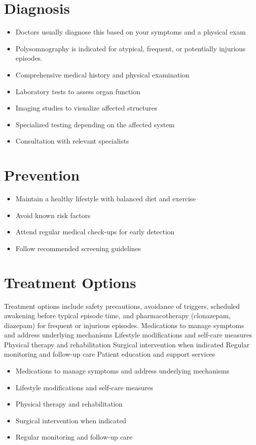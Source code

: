 \section{Diagnosis}
\begin{itemize}[noitemsep]
  \item Doctors usually diagnose this based on your symptoms and a physical exam
  \item Polysomnography is indicated for atypical, frequent, or potentially injurious episodes.
  \item Comprehensive medical history and physical examination
  \item Laboratory tests to assess organ function
  \item Imaging studies to visualize affected structures
  \item Specialized testing depending on the affected system
  \item Consultation with relevant specialists
\end{itemize}
\section{Prevention}
\begin{itemize}[noitemsep]
  \item Maintain a healthy lifestyle with balanced diet and exercise
  \item Avoid known risk factors
  \item Attend regular medical check-ups for early detection
  \item Follow recommended screening guidelines
\end{itemize}
\section{Treatment Options}
Treatment options include safety precautions, avoidance of triggers, scheduled awakening before typical episode time, and pharmacotherapy (clonazepam, diazepam) for frequent or injurious episodes. Medications to manage symptoms and address underlying mechanisms Lifestyle modifications and self-care measures Physical therapy and rehabilitation Surgical intervention when indicated Regular monitoring and follow-up care Patient education and support services

\begin{itemize}[noitemsep]
  \item Medications to manage symptoms and address underlying mechanisms
  \item Lifestyle modifications and self-care measures
  \item Physical therapy and rehabilitation
  \item Surgical intervention when indicated
  \item Regular monitoring and follow-up care
\end{itemize}

